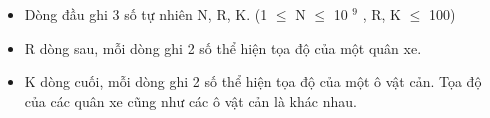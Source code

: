\begin{itemize}
	\item     Dòng đầu ghi 3 số tự nhiên N, R, K. (1  $\le$  N  $\le$  10    $^     9    $    , R, K  $\le$  100)   
	\item     R dòng sau, mỗi dòng ghi 2 số thể hiện tọa độ của một quân xe.   
	\item     K dòng cuối, mỗi dòng ghi 2 số thể hiện tọa độ của một ô vật cản. Tọa độ của các quân xe cũng như các ô vật cản là khác nhau.   
\end{itemize}

\